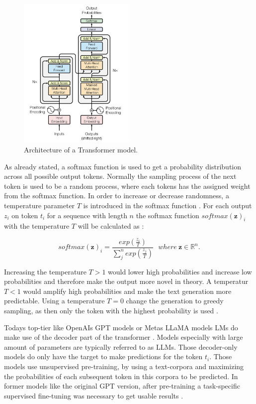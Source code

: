 \documentclass[a4paper,oneside,bibliography=totoc]{scrbook}
\begin{document}
\begin{figure}[t]
  \centering
  \includegraphics[width=0.5\textwidth]{figures/Transformer.png}
  \caption[Architecture of a Transformer model]{Architecture of a Transformer model. \cite{Vaswani2023}}
  \label{fig:transformer}
\end{figure}

As already stated, a softmax function is used to get a probability distribution across all possible output tokens. Normally the sampling process of the next token is used to be a random process, where each tokens has the assigned weight from the softmax function. In order to increase or decrease randomness, a temperature parameter $T$ is introduced in the softmax function \cite{Peeperkorn2024}. For each output $z_i$ on token $t_i$ for a sequence with length $n$ the softmax function $softmax(\mathbf{z})_i$ with the temperature $T$ will be calculated as \cite{Peeperkorn2024}:

\begin{equation}
  softmax(\mathbf{z})_i = \frac{exp(\frac{z_i}{T})}{\sum^n_j exp(\frac{z_j}{T})}~~~where~\mathbf{z} \in \mathbb{R}^n.
\end{equation}

Increasing the temperature $T>1$ would lower high probabilities and increase low probabilities and therefore make the output more novel in theory. A temperatur $T<1$ would amplify high probabilities and make the text generation more predictable. Using a temperature $T=0$ change the generation to greedy sampling, as then only the token with the highest probability is used \cite{Peeperkorn2024}.

Todays top-tier like OpenAIs \ac{GPT} models or Metas \ac{LLaMA} models \acp{LM} do make use of the decoder part of the transformer \cite{Radford2018,Grattafiori2024}. Models especially with large amount of parameters are typically referred to as \acp{LLM}. Those decoder-only models do only have the target to make predictions for the token $t_i$. Those models use unsupervised pre-training, by using a text-corpora and maximizing the probabilities of each subsequent token in this corpora to be predicted. In former models like the original GPT version, after pre-training a task-specific supervised fine-tuning was necessary to get usable results \cite{Radford2018}.
\end{document}
